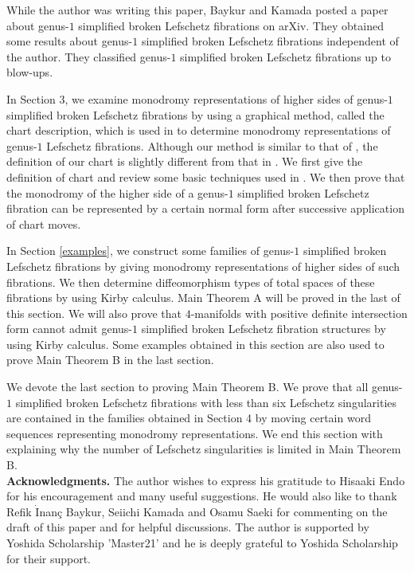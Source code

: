 \documentclass{amsart}
\theoremstyle{plain}
\theoremstyle{definition}
\begin{document}
While the author was writing this paper, Baykur and Kamada \cite{BK} posted a paper about genus-$1$ simplified broken Lefschetz fibrations on arXiv. 
They obtained some results about genus-$1$ simplified broken Lefschetz fibrations independent of the author. 
They classified genus-$1$ simplified broken Lefschetz fibrations up to blow-ups.  

\par

In Section 3, we examine monodromy representations of higher sides of genus-$1$ simplified broken Lefschetz fibrations by using a graphical method, called the chart description, 
which is used in \cite{KMMW} to determine monodromy representations of genus-$1$ Lefschetz fibrations. 
Although our method is similar to that of \cite{KMMW}, the definition of our chart is slightly different from that in \cite{KMMW}. 
We first give the definition of chart and review some basic techniques used in \cite{KMMW}. 
We then prove that the monodromy of the higher side of a genus-$1$ simplified broken Lefschetz fibration can be represented by a certain normal form after successive application of chart moves. 

\par

In Section \ref{examples}, we construct some families of genus-$1$ simplified broken Lefschetz fibrations by giving monodromy representations of higher sides of such fibrations. 
We then determine diffeomorphism types of total spaces of these fibrations by using Kirby calculus. 
Main Theorem A will be proved in the last of this section. 
We will also prove that $4$-manifolds with positive definite intersection form cannot admit genus-$1$ simplified broken Lefschetz fibration structures by using Kirby calculus. 
Some examples obtained in this section are also used to prove Main Theorem B in the last section. 

\par

We devote the last section to proving Main Theorem B. 
We prove that all genus-$1$ simplified broken Lefschetz fibrations with less than six Lefschetz singularities are contained in the families obtained in Section 4 
by moving certain word sequences representing monodromy representations. 
We end this section with explaining why the number of Lefschetz singularities is limited in Main Theorem B. 
\\[7pt]
{\bf Acknowledgments.} The author wishes to express his gratitude to Hisaaki Endo for his encouragement and many useful suggestions. 
He would also like to thank Refik $\dot{\text{I}}$nan\c{c} Baykur, Seiichi Kamada and Osamu Saeki for commenting on the draft of this paper and for helpful discussions. 
The author is supported by Yoshida Scholarship 'Master21' and he is deeply grateful to Yoshida Scholarship for their support. 
\end{document}
